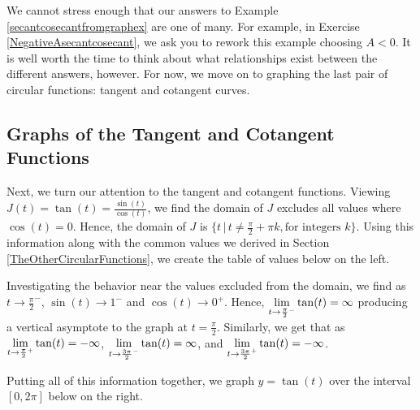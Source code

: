 We cannot stress enough that our answers to Example \ref{secantcosecantfromgraphex} are one of many.  For example, in Exercise \ref{NegativeAsecantcosecant}, we ask you to rework this example choosing $A<0$.  It is well worth the time to think about what relationships exist between the different answers, however.  For now, we move on to graphing the last pair of circular functions: tangent and cotangent curves.


\subsection{Graphs of the Tangent and Cotangent Functions}

Next, we turn our attention to the tangent and cotangent functions.  Viewing $J(t) = \tan(t) = \frac{\sin(t)}{\cos(t)}$, we find the domain of $J$ excludes all values where $\cos(t) = 0$.  Hence, the domain of $J$ is $\{ t \, | \, t \neq  \frac{\pi}{2} + \pi k, \text{for integers $k$} \}$.  Using this information along with the common values we derived in Section \ref{TheOtherCircularFunctions}, we create the table of values below on the left.

\smallskip

Investigating the behavior near the values excluded from the domain, we find as $t \rightarrow \frac{\pi}{2}^{-}$, $\sin(t) \rightarrow 1^{-}$ and $\cos(t) \rightarrow 0^{+}$. Hence,   $\displaystyle{\lim_{t \rightarrow \frac{\pi}{2}^{-}}\tan(t) = \infty}$ producing a vertical asymptote to the graph at $t = \frac{\pi}{2}$.  Similarly, we get that as $\displaystyle{\lim_{t \rightarrow \frac{\pi}{2}^{+}} \tan(t) = -\infty}$,   $\displaystyle{\lim_{t \rightarrow \frac{3\pi}{2}^{-}} \tan(t) = \infty}$, and  $\displaystyle{\lim_{t \rightarrow \frac{3\pi}{2}^{+}}\tan(t) = -\infty}$.

\smallskip

Putting all of this information together, we graph $y = \tan(t)$ over the interval $[0, 2\pi]$ below on the right.

\smallskip

